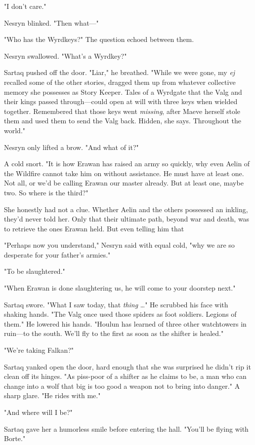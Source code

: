 "I don't care."

Nesryn blinked. "Then what---"

"Who has the Wyrdkeys?" The question echoed between them.

Nesryn swallowed. "What's a Wyrdkey?"

Sartaq pushed off the door. "Liar," he breathed. "While we were gone, my \emph{ej} recalled some of the other stories, dragged them up from whatever collective memory she possesses as Story Keeper. Tales of a Wyrdgate that the Valg and their kings passed through---could open at will with three keys when wielded together. Remembered that those keys went \emph{missing}, after Maeve herself stole them and used them to send the Valg back. Hidden, she says. Throughout the world."

Nesryn only lifted a brow. "And what of it?"

A cold snort. "It is how Erawan has raised an army so quickly, why even Aelin of the Wildfire cannot take him on without assistance. He must have at least one. Not all, or we'd be calling Erawan our master already. But at least one, maybe two. So where is the third?"

She honestly had not a clue. Whether Aelin and the others possessed an inkling, they'd never told her. Only that their ultimate path, beyond war and death, was to retrieve the ones Erawan held. But even telling him that 

"Perhaps now you understand," Nesryn said with equal cold, "why we are so desperate for your father's armies."

"To be slaughtered."

"When Erawan is done slaughtering us, he will come to your doorstep next."

Sartaq swore. "What I saw today, that \emph{thing} \ldots" He scrubbed his face with shaking hands. "The Valg once used those spiders as foot soldiers. Legions of them." He lowered his hands. "Houlun has learned of three other watchtowers in ruin---to the south. We'll fly to the first as soon as the shifter is healed."

"We're taking Falkan?"

Sartaq yanked open the door, hard enough that she was surprised he didn't rip it clean off its hinges. "As piss-poor of a shifter as he claims to be, a man who can change into a wolf that big is too good a weapon not to bring into danger." A sharp glare. "He rides with me."

"And where will I be?"

Sartaq gave her a humorless smile before entering the hall. "You'll be flying with Borte."

